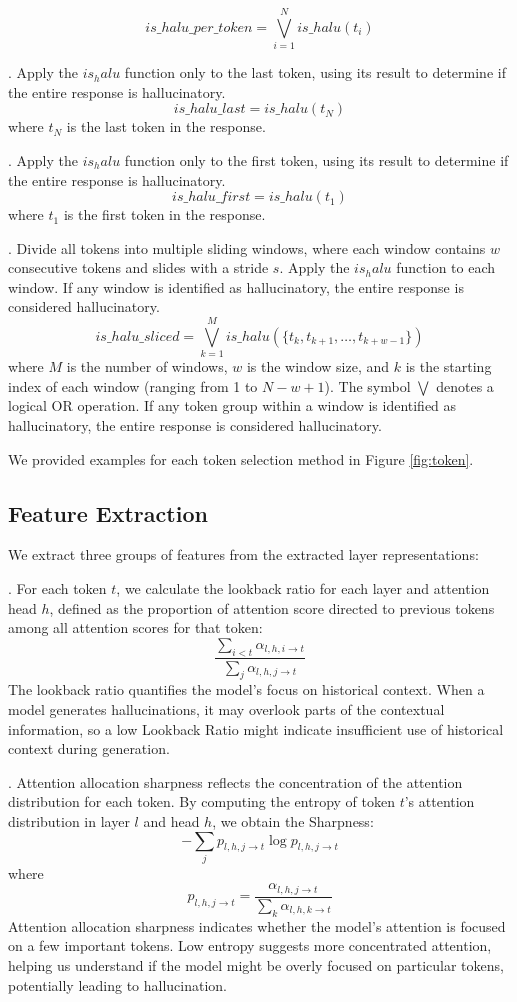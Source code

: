 \[
is\_halu\_per\_token = \bigvee_{i=1}^{N} is\_halu(t_i)
\]

.
Apply the $is_halu$ function only to the last token, using its result to determine if the entire response is hallucinatory.
\[
is\_halu\_last = is\_halu(t_N)
\]
where \( t_N \) is the last token in the response.

.
Apply the $is_halu$ function only to the first token, using its result to determine if the entire response is hallucinatory.
\[
is\_halu\_first = is\_halu(t_1)
\]
where \( t_1 \) is the first token in the response.

.
Divide all tokens into multiple sliding windows, where each window contains \( w \) consecutive tokens and slides with a stride \( s \). Apply the $is_halu$ function to each window. If any window is identified as hallucinatory, the entire response is considered hallucinatory.
\[
is\_halu\_sliced = \bigvee_{k=1}^{M} is\_halu(\{t_{k}, t_{k+1}, \dots, t_{k+w-1}\})
\]
where \( M \) is the number of windows, \( w \) is the window size, and \( k \) is the starting index of each window (ranging from 1 to \( N-w+1 \)). The symbol \( \bigvee \) denotes a logical OR operation. If any token group within a window is identified as hallucinatory, the entire response is considered hallucinatory.

We provided examples for each token selection method in Figure \ref{fig:token}.

\subsection{Feature Extraction}\label{sec:scheme:feature_extract}

We extract three groups of features from the extracted layer representations:

.
For each token $t$, we calculate the lookback ratio for each layer and attention head $h$, defined as the proportion of attention score directed to previous tokens among all attention scores for that token:
\[
\frac{\sum_{i < t} \alpha_{l,h,i \rightarrow t}}{\sum_{j} \alpha_{l,h,j \rightarrow t}}
\]
The lookback ratio quantifies the model's focus on historical context. When a model generates hallucinations, it may overlook parts of the contextual information, so a low Lookback Ratio might indicate insufficient use of historical context during generation.

.
Attention allocation sharpness reflects the concentration of the attention distribution for each token. By computing the entropy of token $t$'s attention distribution in layer $l$ and head $h$, we obtain the Sharpness:
\[
-\sum_{j} p_{l,h,j \rightarrow t} \log p_{l,h,j \rightarrow t}
\]
where
\[
p_{l,h,j \rightarrow t} = \frac{\alpha_{l,h,j \rightarrow t}}{\sum_{k} \alpha_{l,h,k \rightarrow t}}
\]
Attention allocation sharpness indicates whether the model's attention is focused on a few important tokens. Low entropy suggests more concentrated attention, helping us understand if the model might be overly focused on particular tokens, potentially leading to hallucination.


